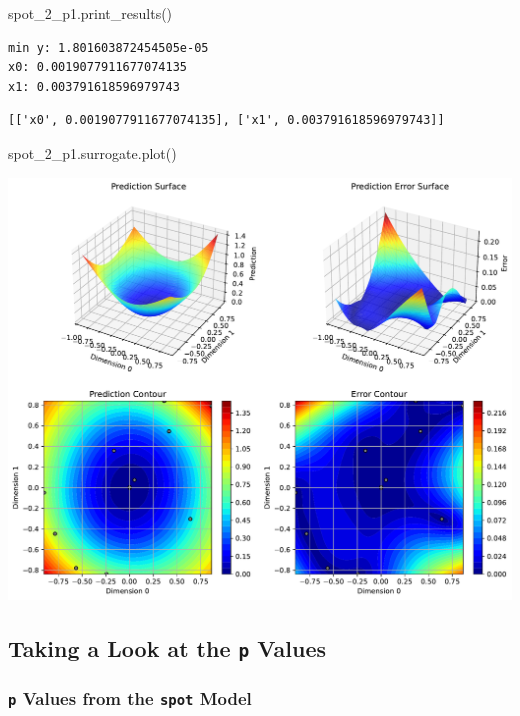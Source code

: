 \documentclass[
  letterpaper,
  DIV=11,
  numbers=noendperiod]{scrreprt}
\newenvironment{Shaded}{\begin{snugshade}}{\end{snugshade}}
\newcommand{\NormalTok}[1]{\textcolor[rgb]{0.00,0.23,0.31}{#1}}
\begin{document}
\begin{Shaded}
\begin{Highlighting}[]
\NormalTok{spot\_2\_p1.print\_results()}
\end{Highlighting}
\end{Shaded}

\begin{verbatim}
min y: 1.801603872454505e-05
x0: 0.0019077911677074135
x1: 0.003791618596979743
\end{verbatim}

\begin{verbatim}
[['x0', 0.0019077911677074135], ['x1', 0.003791618596979743]]
\end{verbatim}

\begin{Shaded}
\begin{Highlighting}[]
\NormalTok{spot\_2\_p1.surrogate.plot()}
\end{Highlighting}
\end{Shaded}

\includegraphics{015_num_spot_correlation_p_files/figure-pdf/cell-12-output-1.pdf}

\subsection{\texorpdfstring{Taking a Look at the \texttt{p}
Values}{Taking a Look at the p Values}}\label{taking-a-look-at-the-p-values}

\subsubsection{\texorpdfstring{\texttt{p} Values from the \texttt{spot}
Model}{p Values from the spot Model}}\label{p-values-from-the-spot-model}
\end{document}
